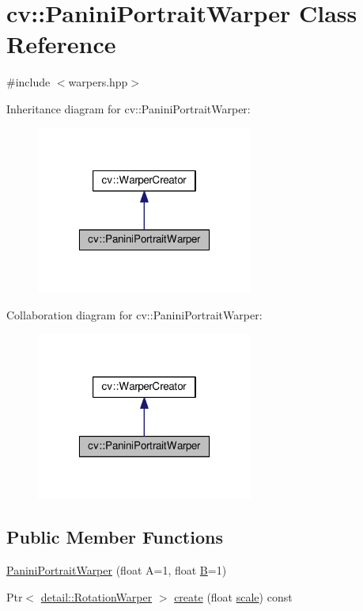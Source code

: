 \hypertarget{classcv_1_1PaniniPortraitWarper}{\section{cv\-:\-:Panini\-Portrait\-Warper Class Reference}
\label{classcv_1_1PaniniPortraitWarper}
}


{\ttfamily \#include $<$warpers.\-hpp$>$}



Inheritance diagram for cv\-:\-:Panini\-Portrait\-Warper\-:\nopagebreak
\begin{figure}[H]
\begin{center}
\leavevmode
\includegraphics[width=202pt]{classcv_1_1PaniniPortraitWarper__inherit__graph}
\end{center}
\end{figure}


Collaboration diagram for cv\-:\-:Panini\-Portrait\-Warper\-:\nopagebreak
\begin{figure}[H]
\begin{center}
\leavevmode
\includegraphics[width=202pt]{classcv_1_1PaniniPortraitWarper__coll__graph}
\end{center}
\end{figure}
\subsection*{Public Member Functions}
\begin{DoxyCompactItemize}
\item 
\hyperlink{classcv_1_1PaniniPortraitWarper_a81d322db1d2ff45c157ae52834b13281}{Panini\-Portrait\-Warper} (float A=1, float \hyperlink{tracking_8hpp_abfbb8a90031c2fb62897dafb4d390f6d}{B}=1)
\item 
Ptr$<$ \hyperlink{classcv_1_1detail_1_1RotationWarper}{detail\-::\-Rotation\-Warper} $>$ \hyperlink{classcv_1_1PaniniPortraitWarper_a061b95fa708bad9baaa555802c94d6bc}{create} (float \hyperlink{objdetect_8hpp_a1f622eb9b9e06b30862ca90cdf2c078b}{scale}) const 
\end{DoxyCompactItemize}


